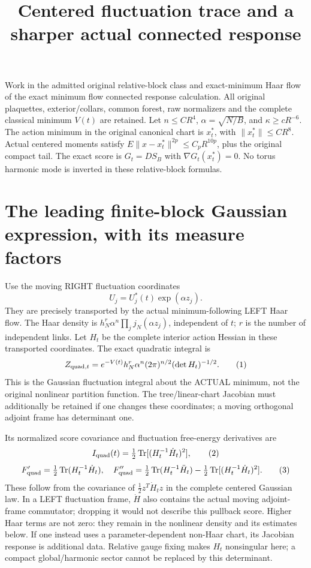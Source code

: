 \documentclass{article}
\title{Centered fluctuation trace and a sharper actual connected response}\author{}\date{}
\begin{document}
\maketitle
Work in the admitted original relative-block class and exact-minimum Haar flow of the exact minimum flow connected response calculation. All original plaquettes, exterior/collars, common forest, raw normalizers and the complete classical minimum $V(t)$ are retained. Let $n\le CR^4$, $\alpha=\sqrt{N/B}$, and $\kappa\ge cR^{-6}$. The action minimum in the original canonical chart is $x_t^*$, with $\|x_t^*\|\le CR^8$. Actual centered moments satisfy $E\|x-x_t^*\|^{2p}\le C_pR^{10p}$, plus the original compact tail. The exact score is $G_t=DS_B$ with $\nabla G_t(x_t^*)=0$. No torus harmonic mode is inverted in these relative-block formulas.

\section*{The leading finite-block Gaussian expression, with its measure factors}
Use the moving RIGHT fluctuation coordinates
\[
 U_j=U_j^*(t)\exp(\alpha z_j).
\]
They are precisely transported by the actual minimum-following LEFT Haar flow. The Haar density is $h_N^r\alpha^n\prod_j j_N(\alpha z_j)$, independent of $t$; $r$ is the number of independent links. Let $H_t$ be the complete interior action Hessian in these transported coordinates. The exact quadratic integral is
\[
 Z_{{\rm quad},t}=e^{-V(t)}h_N^r\alpha^n(2\pi)^{n/2}
                      (\det H_t)^{-1/2}.              \tag{1}
\]
This is the Gaussian fluctuation integral about the ACTUAL minimum, not the original nonlinear partition function. The tree/linear-chart Jacobian must additionally be retained if one changes these coordinates; a moving orthogonal adjoint frame has determinant one.

Its normalized score covariance and fluctuation free-energy derivatives are
\[
 I_{\rm quad}(t)=\tfrac12\operatorname{Tr}[(H_t^{-1}\dot H_t)^2],        \tag{2}
\]
\[
 F_{\rm quad}'=\tfrac12\operatorname{Tr}(H_t^{-1}\dot H_t),\quad
 F_{\rm quad}''=\tfrac12\operatorname{Tr}(H_t^{-1}\ddot H_t)
                -\tfrac12\operatorname{Tr}[(H_t^{-1}\dot H_t)^2].       \tag{3}
\]
These follow from the covariance of $\frac12z^T\dot H_tz$ in the complete centered Gaussian law. In a LEFT fluctuation frame, $\dot H$ also contains the actual moving adjoint-frame commutator; dropping it would not describe this pullback score. Higher Haar terms are not zero: they remain in the nonlinear density and its estimates below. If one instead uses a parameter-dependent non-Haar chart, its Jacobian response is additional data. Relative gauge fixing makes $H_t$ nonsingular here; a compact global/harmonic sector cannot be replaced by this determinant.
\end{document}
